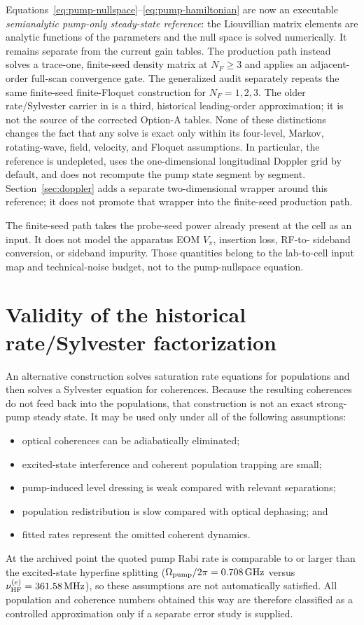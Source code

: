 \documentclass[11pt,a4paper]{article}
\newcommand{\GHz}{\,\mathrm{GHz}}
\newcommand{\MHz}{\,\mathrm{MHz}}
\begin{document}
Equations~\eqref{eq:pump-nullspace}--\eqref{eq:pump-hamiltonian} are now an
executable \emph{semianalytic pump-only steady-state reference}: the
Liouvillian matrix elements are analytic functions of the parameters and the
null space is solved numerically. It remains separate from the current gain
tables. The production path instead solves a
trace-one, finite-seed density matrix at $N_F\geq3$ and applies an adjacent-order
full-scan convergence gate. The generalized audit separately repeats the same
finite-seed finite-Floquet construction for $N_F=1,2,3$.
The older rate/Sylvester carrier in
 is a third,
historical leading-order approximation; it is not the source of the corrected
Option-A tables. None of these distinctions changes the fact that any solve is
exact only within its four-level, Markov, rotating-wave, field, velocity, and
Floquet assumptions. In particular, the reference is undepleted, uses the
one-dimensional longitudinal Doppler grid by default, and does not recompute
the pump state segment by segment. Section~\ref{sec:doppler} adds a separate
two-dimensional wrapper around this reference; it does not promote that
wrapper into the finite-seed production path.

The finite-seed path takes the probe-seed power already present at the cell as
an input. It does not model the apparatus EOM $V_\pi$, insertion loss, RF-to-
sideband conversion, or sideband impurity. Those quantities belong to the
lab-to-cell input map and technical-noise budget, not to the pump-nullspace
equation.

\section{Validity of the historical rate/Sylvester factorization}

An alternative construction solves saturation rate equations for populations
and then solves a Sylvester equation for coherences. Because the resulting
coherences do not feed back into the populations, that construction is not an
exact strong-pump steady state. It may be used only under all of the
following assumptions:
\begin{itemize}
\item optical coherences can be adiabatically eliminated;
\item excited-state interference and coherent population trapping are small;
\item pump-induced level dressing is weak compared with relevant separations;
\item population redistribution is slow compared with optical dephasing; and
\item fitted rates represent the omitted coherent dynamics.
\end{itemize}
At the archived point the quoted pump Rabi rate is comparable to or larger
than the excited-state hyperfine splitting
($\Omega_{\rm pump}/2\pi=0.708\GHz$ versus
$\nu^{(e)}_{\rm HF}=361.58\MHz$), so these assumptions are not automatically
satisfied. All population and coherence
numbers obtained this way are therefore classified as a controlled
approximation only if a separate error study is supplied.
\end{document}
